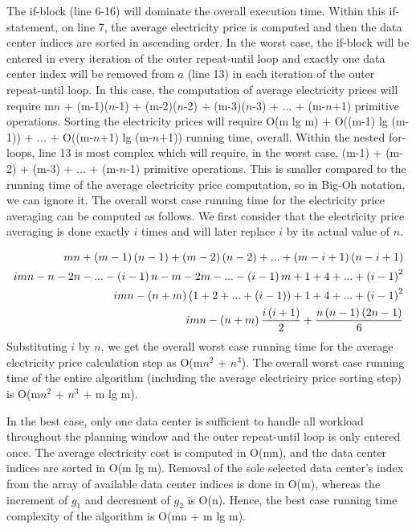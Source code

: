 The if-block (line 6-16) will dominate the overall execution time. Within this if-statement, on line 7, the average electricity price is computed and then the data center indices are sorted in ascending order. In the worst case, the if-block will be entered in every iteration of the outer repeat-until loop and exactly one data center index will be removed from $a$ (line 13) in each iteration of the outer repeat-until loop. In this case, the computation of average electricity prices will require m$n$ + (m-1)($n$-1) + (m-2)($n$-2) + (m-3)($n$-3) + ... + (m-$n$+1) primitive operations. Sorting the electricity prices will require O(m lg m) + O((m-1) lg (m-1)) +  ... + O((m-$n$+1) lg (m-$n$+1)) running time, overall. Within the nested for-loops, line 13 is most complex which will require, in the worst case, (m-1) + (m-2) + (m-3) + ... + (m-$n$-1) primitive operations. This is smaller compared to the running time of the average electricity price computation, so in Big-Oh notation, we can ignore it. The overall worst case running time for the electricity price averaging can be computed as follows. We first consider that the electricity price averaging is done exactly $i$ times and will later replace $i$ by its actual value of $n$.

\begin{align}
mn + \left(m-1\right) \left(n-1\right) + \left(m-2\right) \left(n-2\right) + ... + \left(m-i+1\right) \left(n-i+1\right)\notag \\
i mn - n - 2n - ... - \left(i-1\right)n - m - 2m - ... - \left(i-1\right)m + 1 + 4 + ... + \left(i-1\right)^2\notag \\
i m n - \left(n + m\right)\left(1 + 2 + ... + \left(i-1\right)\right) + 1 + 4 + ... + \left(i-1\right)^2\notag \\
i mn - \left(n + m\right)\frac{i\left(i+1\right)}{2} + \frac{n\left(n-1\right)\left(2n-1\right)}{6}\notag
\end{align}
Substituting $i$ by $n$, we get the overall worst case running time for the average electricity price calculation step as O(m$n^2$ + $n^3$). The overall worst case running time of the entire algorithm (including the average electriciry price sorting step) is O(m$n^2$ + $n^3$ + m lg m).

In the best case, only one data center is sufficient to handle all workload throughout the planning window and the outer repeat-until loop is only entered once. The average electricity cost is computed in O(mn), and the data center indices are sorted in O(m lg m). Removal of the sole selected data center's index from the array of available data center indices is done in O(m), whereas the increment of $g_1$ and decrement of $g_2$ is O(n). Hence, the best case running time complexity of the algorithm is O(mn + m lg m).

